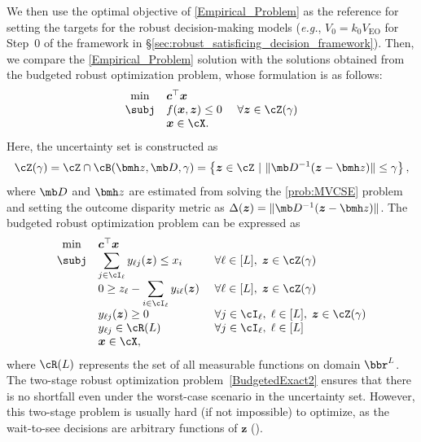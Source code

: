 \documentclass[opre, blindrev]{informs4}
\newcommand{\1}[1]{\mathds{1}{\left(#1\right)}}
\begin{document}
We then use the optimal objective of \ref{Empirical_Problem} as the reference for setting the targets for the robust decision-making models (\textit{e.g.}, $V_0 = k_0 V_{\mathrm{EO}}$ for Step~$0$ of the framework in \S \ref{sec:robust_satisficing_decision_framework}).
Then, we compare the \ref{Empirical_Problem} solution with the solutions obtained from the budgeted robust optimization problem, whose formulation is as follows:
\[
\begin{array}{cll}
\min & \bm c^\top \bm x \\
     \subj 
     & \displaystyle f(\bm x,\bm z)  \leq 0 &~ \forall \bm z \in \cZ(\gamma)\\
     &  {\bm x} \in \cX.
\end{array} 
\]
Here, the uncertainty set is constructed as  
$$
\cZ(\gamma) = \cZ \cap \cB(\bmh z, \mb D, \gamma) = \left\{ \bm z \in \cZ ~|~  \| \mb D^{-1} ( {\bm z} - \bmh z ) \| \leq \gamma \right\}, 
$$
where $\mb D$ and $\bmh z$ are estimated from solving the \ref{prob:MVCSE} problem and setting the outcome disparity metric as $\Delta(\bm z) = \| \mb D^{-1} ( {\bm z} - \bmh z ) \|$.
The budgeted robust optimization problem can be expressed as 
 \begin{equation}\label{BudgetedExact2}
\begin{array}{cll}
\min &  \bm c^\top \bm x \\
     \subj 
     & \displaystyle \sum_{j \in \cI_\ell} y_{\ell j}(\bm z) \leq x_i &~ \forall \ell \in [L],\; \bm z \in \cZ(\gamma)\\
     & \displaystyle 0\geq z_{\ell} - \sum_{i \in \cI_\ell} y_{i \ell}(\bm z) &~ \forall \ell \in [L],\; \bm z \in \cZ(\gamma) \\
     & y_{\ell j}(\bm z) \geq 0 &~ \forall  j \in \cI_\ell,\; \ell \in [L],\; \bm z \in \cZ(\gamma) \\
     & y_{\ell j}\in \cR(L) &~ \forall j \in \cI_\ell,\; \ell \in [L] \\
     &  {\bm x} \in \cX,
\end{array}
\end{equation}
where $\cR(L)$ represents the set of all measurable functions on domain $\bbr^{L}$. The two-stage robust optimization problem~\eqref{BudgetedExact2} ensures that there is no shortfall even under the worst-case scenario in the uncertainty set. However, this two-stage problem is usually hard (if not impossible) to optimize, as the wait-to-see decisions are arbitrary functions of $\bm z$ (\citealt{Bental_Goryashko_Guslitzer_Nemirovski_2004adjustable, atamturk2007two}).
\end{document}
